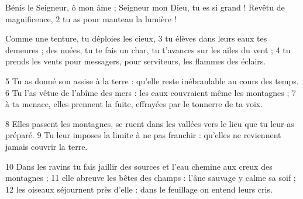 Bénis le Seigneur, ô mon âme ;
Seigneur mon Dieu, tu es si grand !
Revêtu de magnificence,
2 tu as pour manteau la lumière !

Comme une tenture, tu déploies les cieux,
3 tu élèves dans leurs eaux tes demeures ;
des nuées, tu te fais un char,
tu t'avances sur les ailes du vent ;
4 tu prends les vents pour messagers,
pour serviteurs, les flammes des éclairs.

5 Tu as donné son assise à la terre :
qu'elle reste inébranlable au cours des temps.
6 Tu l'as vêtue de l'abîme des mers :
les eaux couvraient même les montagnes ;
7 à ta menace, elles prennent la fuite,
effrayées par le tonnerre de ta voix.

8 Elles passent les montagnes, se ruent dans les vallées
vers le lieu que tu leur as préparé.
9 Tu leur imposes la limite à ne pas franchir :
qu'elles ne reviennent jamais couvrir la terre.

10 Dans les ravins tu fais jaillir des sources
et l'eau chemine aux creux des montagnes ;
11 elle abreuve les bêtes des champs :
l'âne sauvage y calme sa soif ;
12 les oiseaux séjournent près d'elle :
dans le feuillage on entend leurs cris.